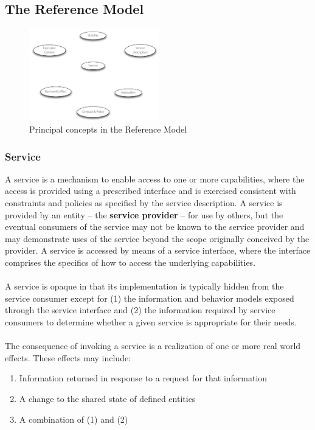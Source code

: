 \documentclass[10pt,a4paper]{article}
\begin{document}
\subsection{The Reference Model}
\begin{figure}[h!]
 \hfill \includegraphics[width=160pt]{images/rm}\hspace*{\fill}
  \caption{Principal concepts in the Reference Model}
  \label{fig:reference-model}
\end{figure} 
\subsubsection{Service}
A service is a mechanism to enable access to one or more capabilities, where the access is provided using a prescribed interface and is exercised consistent with constraints and policies as specified by the service description. A service is provided by an entity – the \textbf{service provider} – for use by others, but the eventual consumers of the service may not be known to the service provider and may demonstrate uses of the service beyond the scope originally conceived by the provider. A service is accessed by means of a service interface, where the interface comprises the specifics of how to access the underlying capabilities. \\ \\
A service is opaque in that its implementation is typically hidden from the service consumer except for (1) the information and behavior models exposed through the service interface and (2) the information required by service consumers to determine whether a given service is appropriate for their needs. \\ \\
The consequence of invoking a service is a realization of one or more real world effects. These effects may include:
\begin{enumerate}
	\item Information returned in response to a request for that information
	\item A change to the shared state of defined entities
	\item A combination of (1) and (2)
\end{enumerate}
\end{document}
